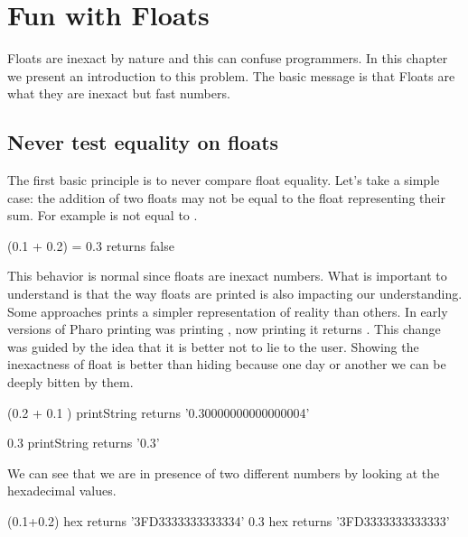 \documentclass[a4paper,10pt,twoside]{book}
\begin{document}
\fi
\sloppy

\chapter{Fun with Floats}
\chapterauthor{\authorsteph{}\\ \authornicolas{}}

Floats are inexact by nature and this can confuse programmers. In this chapter we present 
an introduction to this problem. The basic message is that Floats are what they are inexact 
but fast numbers.


\section{Never test equality on floats}
The first basic principle is to never compare float equality. 
Let's take a simple case: the addition of two floats may not be equal to the float representing their
sum. For example  is not equal to .

\begin{code}{}
(0.1 + 0.2) = 0.3
	returns false
\end{code}

This behavior is normal since floats are inexact numbers. What is important to understand is that the way floats are printed is also impacting our understanding. Some approaches prints a simpler representation of reality than others. In early versions of Pharo printing  was printing , now  printing it returns .
This change was guided by the idea that it is better not to lie to the user. Showing the inexactness of float is better than hiding because one day or another we can be deeply bitten by them. 

\begin{code}{}
(0.2 + 0.1 ) printString
	returns '0.30000000000000004' 

0.3 printString
	returns	'0.3'
\end{code}	

We can see that we are in presence of two different numbers by looking at the hexadecimal values. 

\begin{code}{}
(0.1+0.2) hex 
	returns '3FD3333333333334'
0.3 hex 
	returns '3FD3333333333333' 
\end{code}
\end{document}
